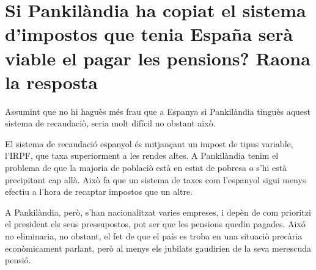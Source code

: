 \section{Si Pankilàndia ha copiat el sistema d’impostos que tenia
España serà viable el pagar les pensions? Raona la resposta}

Assumint que no hi haguès més frau que a Espanya si Pankilàndia tinguès
aquest sistema de recaudaciò, seria molt difícil no obstant això.

El sistema de recaudació espanyol és mitjançant un impost de tipus variable,
l'IRPF, que taxa superiorment a les rendes altes. A Pankilàndia tenim el
problema de que la majoria de poblaciò està en estat de pobresa o s'hi
està precipitant cap allà. Això fa que un sistema de taxes com l'espanyol
sigui menys efectiu a l'hora de recaptar impostos que un altre.

A Pankilàndia, però, s'han nacionalitzat varies empreses, i depèn de com
prioritzi el president els seus pressupostos, pot ser que les pensions 
quedin pagades. Aixó no eliminaria, no obstant, el fet de que el país
es troba en una situaciò precària econòmicament parlant, 
però al menys els jubilats gaudirien
de la seva merescuda pensió.


